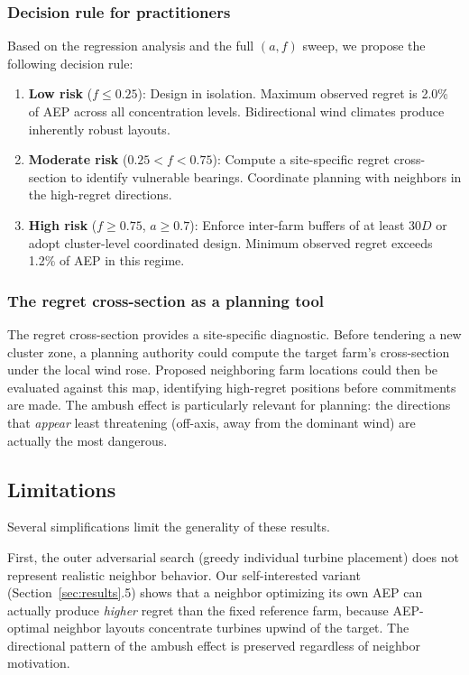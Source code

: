\documentclass[manuscript, 12pt]{copernicus}
\begin{document}
\subsubsection{Decision rule for practitioners}

Based on the regression analysis and the full $(a, f)$ sweep, we propose the following decision rule:
\begin{enumerate}
    \item \textbf{Low risk} ($f \leq 0.25$): Design in isolation.
    Maximum observed regret is 2.0\% of AEP across all concentration levels.
    Bidirectional wind climates produce inherently robust layouts.
    \item \textbf{Moderate risk} ($0.25 < f < 0.75$): Compute a site-specific regret cross-section to identify vulnerable bearings.
    Coordinate planning with neighbors in the high-regret directions.
    \item \textbf{High risk} ($f \geq 0.75$, $a \geq 0.7$): Enforce inter-farm buffers of at least 30$D$ or adopt cluster-level coordinated design.
    Minimum observed regret exceeds 1.2\% of AEP in this regime.
\end{enumerate}

\subsubsection{The regret cross-section as a planning tool}

The regret cross-section provides a site-specific diagnostic.
Before tendering a new cluster zone, a planning authority could compute the target farm's cross-section under the local wind rose.
Proposed neighboring farm locations could then be evaluated against this map, identifying high-regret positions before commitments are made.
The ambush effect is particularly relevant for planning: the directions that \emph{appear} least threatening (off-axis, away from the dominant wind) are actually the most dangerous.

\subsection{Limitations}

Several simplifications limit the generality of these results.

First, the outer adversarial search (greedy individual turbine placement) does not represent realistic neighbor behavior.
Our self-interested variant (Section~\ref{sec:results}.5) shows that a neighbor optimizing its own AEP can actually produce \emph{higher} regret than the fixed reference farm, because AEP-optimal neighbor layouts concentrate turbines upwind of the target.
The directional pattern of the ambush effect is preserved regardless of neighbor motivation.
\end{document}
